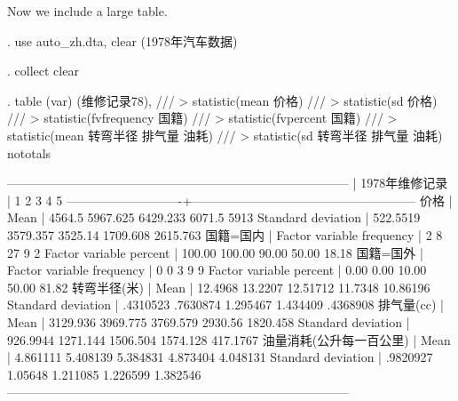 \documentclass{ctexart}
\begin{document}
Now we include a large table.

\iffalse
. use auto_zh.dta, clear
(1978年汽车数据)

. collect clear

. table (var) (维修记录78),              ///
>       statistic(mean 价格)          ///
>       statistic(sd 价格)                              ///      
>           statistic(fvfrequency 国籍)  ///
>       statistic(fvpercent 国籍)     ///
>       statistic(mean 转弯半径 排气量 油耗)          ///
>       statistic(sd  转弯半径 排气量 油耗) nototals

-----------------------------------------------------------------------------------
                            |                     1978年维修记录                   
                            |         1          2          3          4          5
----------------------------+------------------------------------------------------
价格                        |                                                      
  Mean                      |    4564.5   5967.625   6429.233     6071.5       5913
  Standard deviation        |  522.5519   3579.357    3525.14   1709.608   2615.763
国籍=国内                   |                                                      
  Factor variable frequency |         2          8         27          9          2
  Factor variable percent   |    100.00     100.00      90.00      50.00      18.18
国籍=国外                   |                                                      
  Factor variable frequency |         0          0          3          9          9
  Factor variable percent   |      0.00       0.00      10.00      50.00      81.82
转弯半径(米)                |                                                      
  Mean                      |   12.4968    13.2207   12.51712    11.7348   10.86196
  Standard deviation        |  .4310523   .7630874   1.295467   1.434409   .4368908
排气量(cc)                  |                                                      
  Mean                      |  3129.936   3969.775   3769.579    2930.56   1820.458
  Standard deviation        |  926.9944   1271.144   1506.504   1574.128   417.1767
油量消耗(公升每一百公里)    |                                                      
  Mean                      |  4.861111   5.408139   5.384831   4.873404   4.048131
  Standard deviation        |  .9820927    1.05648   1.211085   1.226599   1.382546
-----------------------------------------------------------------------------------
\end{document}
